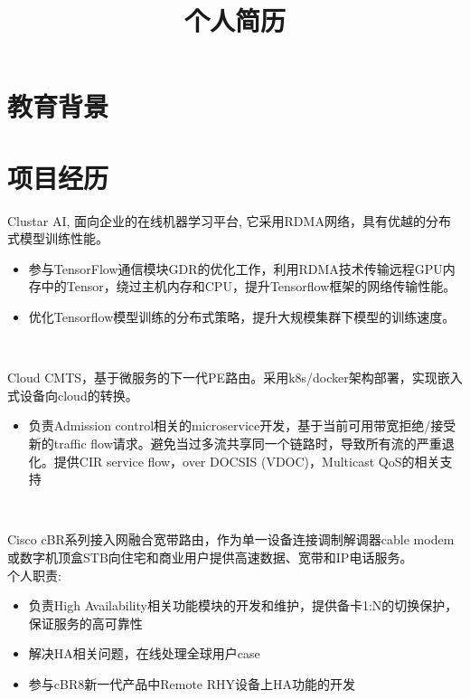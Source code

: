 \documentclass[11pt,a4paper]{moderncv}
\title{个人简历}                      %
\begin{document}
\maketitle
\renewcommand{\baselinestretch}{1}

\section{教育背景}


\section{项目经历}
\renewcommand{\baselinestretch}{1}
{Clustar\,\,AI, 面向企业的在线机器学习平台, 它采用RDMA网络，具有优越的分布式模型训练性能。
\begin{itemize}
\item 参与TensorFlow通信模块GDR的优化工作，利用RDMA技术传输远程GPU内存中的Tensor，绕过主机内存和CPU，提升Tensorflow框架的网络传输性能。
\item 优化Tensorflow模型训练的分布式策略，提升大规模集群下模型的训练速度。
\end{itemize}}
\\
{Cloud\,\,CMTS，基于微服务的下一代PE路由。采用k8s/docker架构部署，实现嵌入式设备向cloud的转换。
\begin{itemize}
\item 负责Admission control相关的microservice开发，基于当前可用带宽拒绝/接受新的traffic flow请求。避免当过多流共享同一个链路时，导致所有流的严重退化。提供CIR service flow，over DOCSIS (VDOC)，Multicast QoS的相关支持
\end{itemize}}
\\
{Cisco cBR系列接入网融合宽带路由，作为单一设备连接调制解调器cable modem或数字机顶盒STB向住宅和商业用户提供高速数据、宽带和IP电话服务。\\
个人职责:
\begin{itemize}
\item 负责High\,\,Availability相关功能模块的开发和维护，提供备卡1:N的切换保护，保证服务的高可靠性
\item 解决HA相关问题，在线处理全球用户case
\item 参与cBR8新一代产品中Remote RHY设备上HA功能的开发
\end{itemize}}
\end{document}
